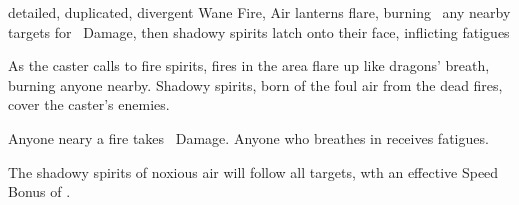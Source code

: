   {detailed, duplicated, divergent}%
  {Wane}%
  {Fire, Air}%
  {}%
  {lanterns flare, burning \spellArea\ any nearby targets for \rollConv\ Damage, then shadowy spirits latch onto their face, inflicting  \glspl{fatigue}}%
  {
    As the caster calls to fire spirits, fires in the area flare up like dragons' breath, burning anyone nearby.
    Shadowy spirits, born of the foul air from the dead fires, cover the caster's enemies.

    Anyone neary a fire takes \rollConv\ Damage.
    Anyone who breathes in receives  \glspl{fatigue}.

    The shadowy spirits of noxious air will follow all targets, wth an effective Speed Bonus of .
  }

